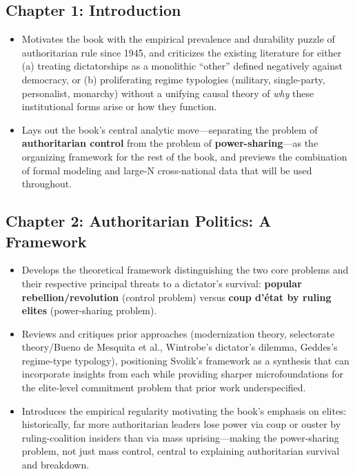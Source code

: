 \documentclass[12pt]{article}
\begin{document}
\subsection*{Chapter 1: Introduction}

\begin{itemize}[leftmargin=*, itemsep=4pt]
    \item Motivates the book with the empirical prevalence and durability puzzle of authoritarian rule since 1945, and criticizes the existing literature for either (a) treating dictatorships as a monolithic ``other'' defined negatively against democracy, or (b) proliferating regime typologies (military, single-party, personalist, monarchy) without a unifying causal theory of \emph{why} these institutional forms arise or how they function.
    \item Lays out the book's central analytic move---separating the problem of \textbf{authoritarian control} from the problem of \textbf{power-sharing}---as the organizing framework for the rest of the book, and previews the combination of formal modeling and large-N cross-national data that will be used throughout.
\end{itemize}

\subsection*{Chapter 2: Authoritarian Politics: A Framework}

\begin{itemize}[leftmargin=*, itemsep=4pt]
    \item Develops the theoretical framework distinguishing the two core problems and their respective principal threats to a dictator's survival: \textbf{popular rebellion/revolution} (control problem) versus \textbf{coup d'\'etat by ruling elites} (power-sharing problem).
    \item Reviews and critiques prior approaches (modernization theory, selectorate theory/Bueno de Mesquita et al., Wintrobe's dictator's dilemma, Geddes's regime-type typology), positioning Svolik's framework as a synthesis that can incorporate insights from each while providing sharper microfoundations for the elite-level commitment problem that prior work underspecified.
    \item Introduces the empirical regularity motivating the book's emphasis on elites: historically, far more authoritarian leaders lose power via coup or ouster by ruling-coalition insiders than via mass uprising---making the power-sharing problem, not just mass control, central to explaining authoritarian survival and breakdown.
\end{itemize}
\end{document}

